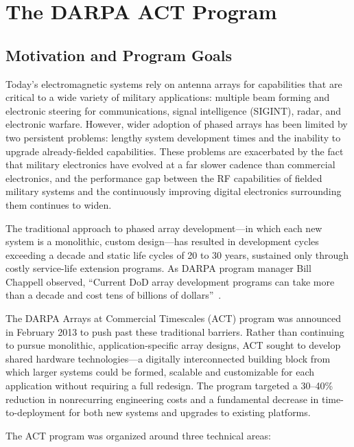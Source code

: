\section{The DARPA ACT Program}

\subsection{Motivation and Program Goals}

Today's electromagnetic systems rely on antenna arrays for capabilities that are critical to a wide variety of military applications: multiple beam forming and electronic steering for communications, signal intelligence (SIGINT), radar, and electronic warfare.  However, wider adoption of phased arrays has been limited by two persistent problems: lengthy system development times and the inability to upgrade already-fielded capabilities.  These problems are exacerbated by the fact that military electronics have evolved at a far slower cadence than commercial electronics, and the performance gap between the RF capabilities of fielded military systems and the continuously improving digital electronics surrounding them continues to widen.

The traditional approach to phased array development---in which each new system is a monolithic, custom design---has resulted in development cycles exceeding a decade and static life cycles of 20 to 30 years, sustained only through costly service-life extension programs.  As DARPA program manager Bill Chappell observed, ``Current DoD array development programs can take more than a decade and cost tens of billions of dollars''~\cite{DARPAact2013}.

The DARPA Arrays at Commercial Timescales (ACT) program was announced in February 2013 to push past these traditional barriers.  Rather than continuing to pursue monolithic, application-specific array designs, ACT sought to develop shared hardware technologies---a digitally interconnected building block from which larger systems could be formed, scalable and customizable for each application without requiring a full redesign.  The program targeted a 30--40\% reduction in nonrecurring engineering costs and a fundamental decrease in time-to-deployment for both new systems and upgrades to existing platforms.

The ACT program was organized around three technical areas:

